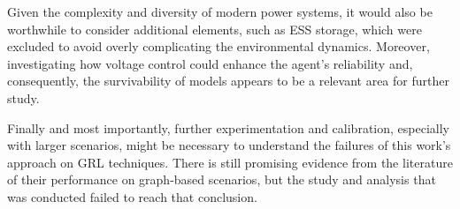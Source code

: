 Given the complexity and diversity of modern power systems, it would also be worthwhile to consider additional elements, such as \acf{ESS} storage, which were excluded to avoid overly complicating the environmental dynamics. Moreover, investigating how voltage control could enhance the agent's reliability and, consequently, the survivability of models appears to be a relevant area for further study. \par

Finally and most importantly, further experimentation and calibration, especially with larger scenarios, might be necessary to understand the failures of this work's approach on \ac{GRL} techniques. There is still promising evidence from the literature of their performance on graph-based scenarios, but the study and analysis that was conducted failed to reach that conclusion. 

